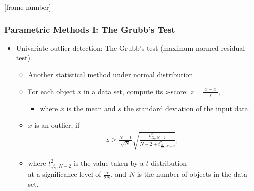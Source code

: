 \documentclass[aspectratio=169,t,xcolor=dvipsnames]{beamer}
\begin{document}
{
  [frame number]
  \begin{frame}
	\frametitle{Parametric Methods I: The Grubb's Test}
	\begin{itemize}
		\item Univariate outlier detection: The Grubb's test (maximum normed residual test).
		      \begin{itemize}
		      	\item Another statistical method under normal distribution
		      	\item For each object $x$ in a data set, compute its $z$-score:  $z = \frac{\vert x - \overline{x}\vert}{s}$,
		      	      \begin{itemize}
		      	      	\item where $\overline{x}$ is the mean and $s$ the standard deviation of the input data.
		      	      \end{itemize}
		      	\item $x$ is an outlier, if
            \begin{align}
              z \geq \frac{N-1}{\sqrt{N}} \sqrt{\frac{t^2_{\frac{\alpha}{2N},N-2}}{N-2 + t^2_{\frac{\alpha}{2N},N-2}}},
            \end{align}
		      \end{itemize}
		      \begin{itemize}
		      	\item where $t^2_{\frac{\alpha}{2N},N-2}$ is the value taken by a $t$-distribution \\
            at a significance level of $\frac{\alpha}{2N}$, and $N$ is the number of objects in the data set.
		      \end{itemize}
	\end{itemize}
  \end{frame}
}
\end{document}
